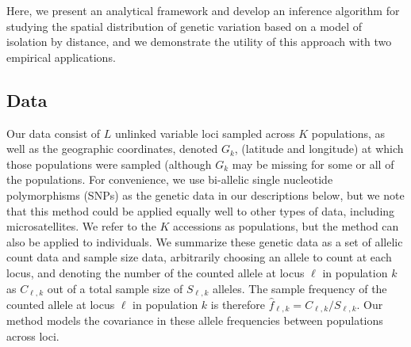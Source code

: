 \documentclass[12pt]{article}
\newcommand{\gb}[1]{{\em \color{magenta} #1}}
\begin{document}

Here, we present an analytical framework and develop an inference algorithm for studying the spatial distribution of genetic variation based on a model of isolation by distance, and we demonstrate the utility of this approach with two empirical applications.


\subsection*{Data}
Our data consist of $L$ unlinked variable loci sampled across $K$ populations, as well as the geographic coordinates, denoted $G_k$, (latitude and longitude) at which those populations were sampled (although $G_k$ may be missing for some or all of the populations.  For convenience, we use bi-allelic single nucleotide polymorphisms (SNPs) as the genetic data in our descriptions below, but we note that this method could be applied equally well to other types of data, including microsatellites.  We refer to the $K$ accessions as populations, but the method can also be applied to individuals.  We summarize these genetic data as a set of allelic count data and sample size data, arbitrarily choosing an allele to count at each locus, and denoting the number of the counted allele at locus $\ell$ in population $k$ as $C_{\ell,k}$ out of a total sample size of $S_{\ell,k}$ alleles.  The sample frequency of the counted allele at locus $\ell$ in population $k$ is therefore $\hat{f}_{\ell,k} = C_{\ell,k}/S_{\ell,k}$.  Our method models the covariance in these allele frequencies between populations across loci.

\end{document}
